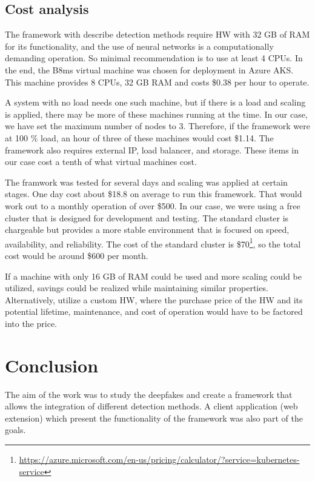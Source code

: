 \section{Cost analysis}

The framework with describe detection methods require HW with 32 GB of RAM for its functionality, and the use of neural networks is a computationally demanding operation. So minimal recommendation is to use at least 4 CPUs. In the end, the B8ms virtual machine was chosen for deployment in Azure AKS. This machine provides 8 CPUs, 32 GB RAM and costs \$0.38 per hour to operate. 

A system with no load needs one such machine, but if there is a load and scaling is applied, there may be more of these machines running at the time. In our case, we have set the maximum number of nodes to 3. Therefore, if the framework were at 100 \% load, an hour of three of these machines would cost \$1.14. The framework also requires external IP, load balancer, and storage. These items in our case cost a tenth of what virtual machines cost.

The framwork was tested for several days and scaling was applied at certain stages. One day cost about \$18.8 on average to run this framework. That would work out to a monthly operation of over \$500. In our case, we were using a free cluster that is designed for development and testing. The standard cluster is chargeable but provides a more stable environment that is focused on speed, availability, and reliability. The cost of the standard cluster is \$70\footnote{\url{https://azure.microsoft.com/en-us/pricing/calculator/?service=kubernetes-service}}, so the total cost would be around \$600 per month.

If a machine with only 16 GB of RAM could be used and more scaling could be utilized, savings could be realized while maintaining similar properties. Alternatively, utilize a custom HW, where the purchase price of the HW and its potential lifetime, maintenance, and cost of operation would have to be factored into the price. 

\chapter{Conclusion}

The aim of the work was to study the deepfakes and create a framework that allows the integration of different detection methods. A client application (web extension) which present the functionality of the framework was also part of the goals. 

